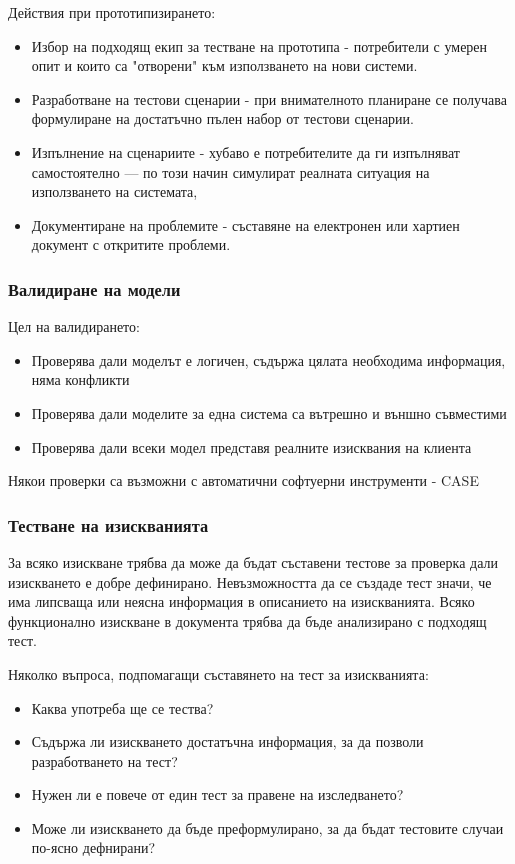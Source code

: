 \documentclass[fleqn,12pt]{article}
\begin{document}
Действия при прототипизирането:
\begin{itemize}
	\item Избор на подходящ екип за тестване на прототипа - потребители с умерен опит и които са "отворени" към използването на нови системи.
	\item Разработване на тестови сценарии - при внимателното планиране се получава формулиране на достатъчно пълен набор от тестови сценарии.
	\item Изпълнение на сценариите - хубаво е потребителите да ги изпълняват самостоятелно --- по този начин симулират реалната ситуация на използването на системата,
	\item Документиране на проблемите - съставяне на електронен или хартиен документ с откритите проблеми.
\end{itemize}

\subsubsection{Валидиране на модели}

Цел на валидирането:
\begin{itemize}
	\item Проверява дали моделът е логичен, съдържа цялата необходима информация, няма конфликти
	\item Проверява дали моделите за една система са вътрешно и външно съвместими
	\item Проверява дали всеки модел представя реалните изисквания на клиента
\end{itemize}

Някои проверки са възможни с автоматични софтуерни инструменти - CASE

\subsubsection{Тестване на изискванията}
За всяко изискване трябва да може да бъдат съставени тестове за проверка дали изискването е добре дефинирано. Невъзможността да се създаде тест значи, че има липсваща или неясна информация в описанието на изискванията. Всяко функционално изискване в документа трябва да бъде анализирано с подходящ тест.

Няколко въпроса, подпомагащи съставянето на тест за изискванията:
\begin{itemize}
	\item Каква употреба ще се тества?
	\item Съдържа ли изискването достатъчна информация, за да позволи разработването на тест?
	\item Нужен ли е повече от един тест за правене на изследването?
	\item Може ли изискването да бъде преформулирано, за да бъдат тестовите случаи по-ясно дефнирани?
\end{itemize}
\end{document}
